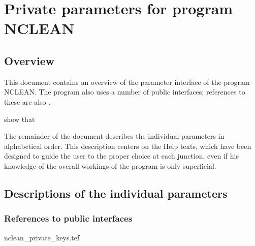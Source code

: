 
\chapter{ Private parameters for program NCLEAN}
\tableofcontents


\section{ Overview}

	This document contains an overview of the parameter interface of the
program NCLEAN. The program also uses a number of public interfaces; references
to these are also .

show %
that %


	The remainder of the document describes the individual parameters in
alphabetical order. This description centers on the Help texts, which have been
designed to guide the user to the proper choice at each junction, even if his
knowledge of the overall workings of the program is only superficial.


\section{ Descriptions of the individual parameters}
\label{.descriptions}

\subsection{ References to public interfaces}
\label{.public}

 {nclean_private_keys.tef}
